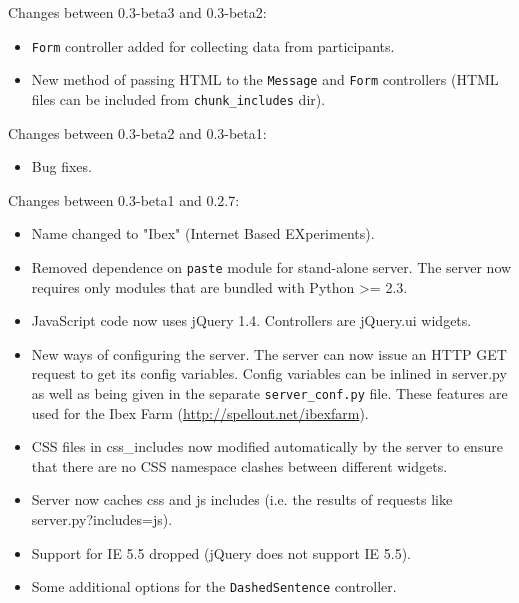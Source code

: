\documentclass[
]{article}
\providecommand{\tightlist}{%
  \setlength{\itemsep}{0pt}\setlength{\parskip}{0pt}}
\begin{document}
Changes between 0.3-beta3 and 0.3-beta2:

\begin{itemize}
\tightlist
\item
  \texttt{Form} controller added for collecting data from participants.
\item
  New method of passing HTML to the \texttt{Message} and \texttt{Form}
  controllers (HTML files can be included from \texttt{chunk\_includes}
  dir).
\end{itemize}

Changes between 0.3-beta2 and 0.3-beta1:

\begin{itemize}
\tightlist
\item
  Bug fixes.
\end{itemize}

Changes between 0.3-beta1 and 0.2.7:

\begin{itemize}
\tightlist
\item
  Name changed to "Ibex" (Internet Based EXperiments).
\item
  Removed dependence on \texttt{paste} module for stand-alone server.
  The server now requires only modules that are bundled with Python
  \textgreater= 2.3.
\item
  JavaScript code now uses jQuery 1.4. Controllers are jQuery.ui
  widgets.
\item
  New ways of configuring the server. The server can now issue an HTTP
  GET request to get its config variables. Config variables can be
  inlined in server.py as well as being given in the separate
  \texttt{server\_conf.py} file. These features are used for the Ibex
  Farm (\url{http://spellout.net/ibexfarm}).
\item
  CSS files in css\_includes now modified automatically by the server to
  ensure that there are no CSS namespace clashes between different
  widgets.
\item
  Server now caches css and js includes (i.e. the results of requests
  like server.py?includes=js).
\item
  Support for IE 5.5 dropped (jQuery does not support IE 5.5).
\item
  Some additional options for the \texttt{DashedSentence} controller.
\end{itemize}
\end{document}
